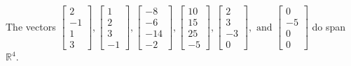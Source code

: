 \begin{exercise}
\begin{exerciseStatement}
  \end{exerciseStatement}
  \begin{exerciseAnswer}
   The vectors \(\left[\begin{array}{r}
2 \\
-1 \\
1 \\
3
\end{array}\right] , \left[\begin{array}{r}
1 \\
2 \\
3 \\
-1
\end{array}\right] , \left[\begin{array}{r}
-8 \\
-6 \\
-14 \\
-2
\end{array}\right] , \left[\begin{array}{r}
10 \\
15 \\
25 \\
-5
\end{array}\right] , \left[\begin{array}{r}
2 \\
3 \\
-3 \\
0
\end{array}\right] , \text{ and } \left[\begin{array}{r}
0 \\
-5 \\
0 \\
0
\end{array}\right]\) 
  	 do  
	span \(\mathbb{R}^4\).
  


  \end{exerciseAnswer}
\end{exercise}